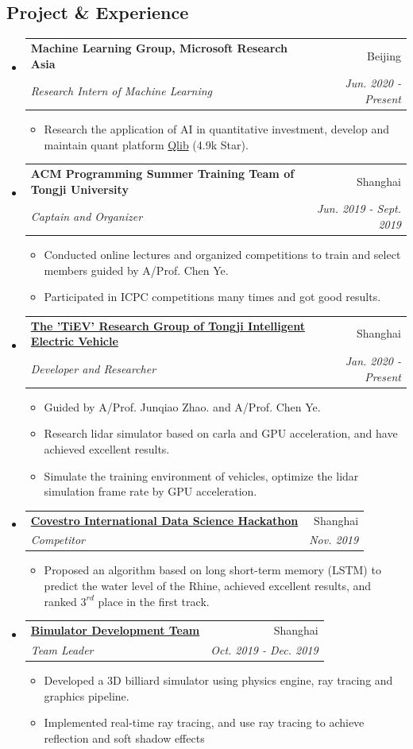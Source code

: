 \documentclass[letterpaper,11pt]{article}
\makeatletter
\newcommand{\resumeItem}[2]{
  \item\small{
    \textbf{#1}{ #2 \vspace{-2pt}}
  }
}
\newcommand{\resumeSubheading}[4]{
  \vspace{-1pt}\item
    \begin{tabular*}{0.97\textwidth}{l@{\extracolsep{\fill}}r}
      \textbf{#1} & #2 \\
      \textit{\small#3} & \textit{\small #4} \\
    \end{tabular*}\vspace{-5pt}
}
\newcommand{\resumeSubHeadingListStart}{\begin{itemize}[leftmargin=*]}
\newcommand{\resumeSubHeadingListEnd}{\end{itemize}}
\newcommand{\resumeItemListStart}{\begin{itemize}}
\newcommand{\resumeItemListEnd}{\end{itemize}\vspace{-5pt}}
\makeatother
\begin{document}
\begin{spacing}{1}
\section{Project \& Experience}
  \resumeSubHeadingListStart
    \resumeSubheading
      {Machine Learning Group, Microsoft Research Asia}{Beijing}
      {Research Intern of Machine Learning}{Jun. 2020 - Present}
      \resumeItemListStart
        \resumeItem{}{Research the application of AI in quantitative investment, develop and maintain quant platform \href{https://github.com/microsoft/qlib}{Qlib} (4.9k Star).}
      \resumeItemListEnd


    \resumeSubheading
      {ACM Programming Summer Training Team of Tongji University}{Shanghai}
      {Captain and Organizer}{Jun. 2019 - Sept. 2019}
      \resumeItemListStart
      \resumeItem{}
          {Conducted online lectures and organized competitions to train and select members guided by A/Prof. Chen Ye.}
        \resumeItem{}
          {Participated in ICPC competitions many times and got good results.}
      \resumeItemListEnd
    \resumeSubheading
      {\href{https://github.com/tiev-tongji/carla-ex}{The 'TiEV' Research Group of Tongji Intelligent Electric Vehicle}
      }{Shanghai}
      {Developer and Researcher}{Jan. 2020 - Present}
      \resumeItemListStart
        \resumeItem{}
          {Guided by A/Prof. Junqiao Zhao. and A/Prof. Chen Ye.}
         \resumeItem{}
          {Research lidar simulator based on carla and GPU acceleration, and have achieved excellent results.}
         \resumeItem{}
         {Simulate the training environment of vehicles, optimize the lidar simulation frame rate by GPU acceleration.}
          
      \resumeItemListEnd
    \resumeSubheading
      {\href{https://www.covestro.cn/zh-cn/media/news-releases/2019/covestro-holds-its-first-ever-international-data-science-hackathon-across-three-continents}{Covestro International Data Science Hackathon}}{Shanghai}
      {Competitor}{Nov. 2019}
      \resumeItemListStart
        \resumeItem{}
          {Proposed an algorithm based on long short-term memory (LSTM) to predict the water level of the Rhine, achieved excellent results, and ranked $3^{rd}$ place in the first track.}
      \resumeItemListEnd
     \resumeSubheading
      {\href{https://github.com/ganler/bimulator}{Bimulator Development Team}}{Shanghai}
      {Team Leader}{Oct. 2019 - Dec. 2019}
      \resumeItemListStart
        \resumeItem{}
          {Developed a 3D billiard simulator using physics engine, ray tracing and graphics pipeline.
         }
         \resumeItem{}
         {Implemented real-time ray tracing, and use ray tracing to achieve reflection and soft shadow effects}
      \resumeItemListEnd
  \resumeSubHeadingListEnd
  

\end{spacing}
\end{document}
